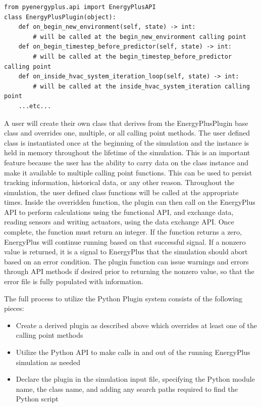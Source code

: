 \documentclass[5p]{elsarticle}
\begin{document}
\lstset{language=python}
\begin{lstlisting}
from pyenergyplus.api import EnergyPlusAPI
class EnergyPlusPlugin(object):
    def on_begin_new_environment(self, state) -> int:
        # will be called at the begin_new_environment calling point
    def on_begin_timestep_before_predictor(self, state) -> int:
        # will be called at the begin_timestep_before_predictor calling point
    def on_inside_hvac_system_iteration_loop(self, state) -> int:
        # will be called at the inside_hvac_system_iteration calling point
    ...etc...
\end{lstlisting}

A user will create their own class that derives from the EnergyPlusPlugin base class and overrides one, multiple, or all calling point methods.  The user defined class is instantiated once at the beginning of the simulation and the instance is held in memory throughout the lifetime of the simulation.  This is an important feature because the user has the ability to carry data on the class instance and make it available to multiple calling point functions.  This can be used to persist tracking information, historical data, or any other reason.  Throughout the simulation, the user defined class functions will be called at the appropriate times.  Inside the overridden function, the plugin can then call on the EnergyPlus API to perform calculations using the functional API, and exchange data, reading sensors and writing actuators, using the data exchange API.  Once complete, the function must return an integer.  If the function returns a zero, EnergyPlus will continue running based on that successful signal.  If a nonzero value is returned, it is a signal to EnergyPlus that the simulation should abort based on an error condition.  The plugin function can issue warnings and errors through API methods if desired prior to returning the nonzero value, so that the error file is fully populated with information.

The full process to utilize the Python Plugin system consists of the following pieces:
\begin{itemize}
 \item Create a derived plugin as described above which overrides at least one of the calling point methods
 \item Utilize the Python API to make calls in and out of the running EnergyPlus simulation as needed
 \item Declare the plugin in the simulation input file, specifying the Python module name, the class name, and adding any search paths required to find the Python script
\end{itemize}
\end{document}
